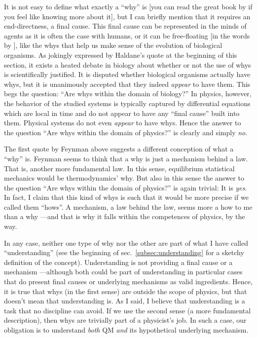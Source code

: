 \documentclass[12pt]{article}
\begin{document}
It is not easy to define what exactly a ``why'' is [you can read the great
book by \cite{Deacon2012} if you feel like knowing more about it], but I can
briefly mention that it requires an end-directness, a final cause. This final
cause can be represented in the minds of agents as it is often the case with
humans, or it can be free-floating [in the words by \cite{Dennett1995}], like
the whys that help us make sense of the evolution of biological organisms. As
jokingly expressed by Haldane's quote at the beginning of this section, it
exists a heated debate in biology about whether or not the use of whys is
scientifically justified. It is disputed whether biological organisms actually
have whys, but it is unanimously accepted that they indeed \emph{appear} to
have them. This begs the question: ``Are whys within the domain of biology?''
In physics, however, the behavior of the studied systems is typically captured
by differential equations which are local in time and do not appear to have
any ``final cause'' built into them. Physical systems do not even
\emph{appear} to have whys. Hence the answer to the question ``Are whys within
the domain of physics?'' is clearly and simply \emph{no}.

The first quote by Feynman above suggests a different conception of what a
``why'' is. Feynman seems to think that a why is just a mechanism behind a
law. That is, another more fundamental law. In this sense, equilibrium
statistical mechanics would be thermodynamics' why. But also in this sense the
answer to the question ``Are whys within the domain of physics?'' is again
trivial: It is \emph{yes}. In fact, I claim that this kind of whys is such
that it would be more precise if we called them ``hows''. A mechanism, a law
behind the law, seems more a how to me than a why ---and that is why it falls
within the competences of physics, by the way.

In any case, neither one type of why nor the other are part of what I have
called ``understanding'' (see the beginning of sec.~\ref{subsec:understanding}
for a sketchy definition of the concept). Understanding is not providing a
final cause or a mechanism ---although both could be part of understanding in
particular cases that do present final causes or underlying mechanisms as
valid ingredients. Hence, it is true that whys (in the first sense) are
outside the scope of physics, but that doesn't mean that understanding is. As
I said, I believe that understanding is a task that no discipline can avoid.
If we use the second sense (a more fundamental description), then whys are
trivially part of a physicist's job. In such a case, our obligation is to
understand \emph{both} QM \emph{and} its hypothetical underlying mechanism.
\end{document}
